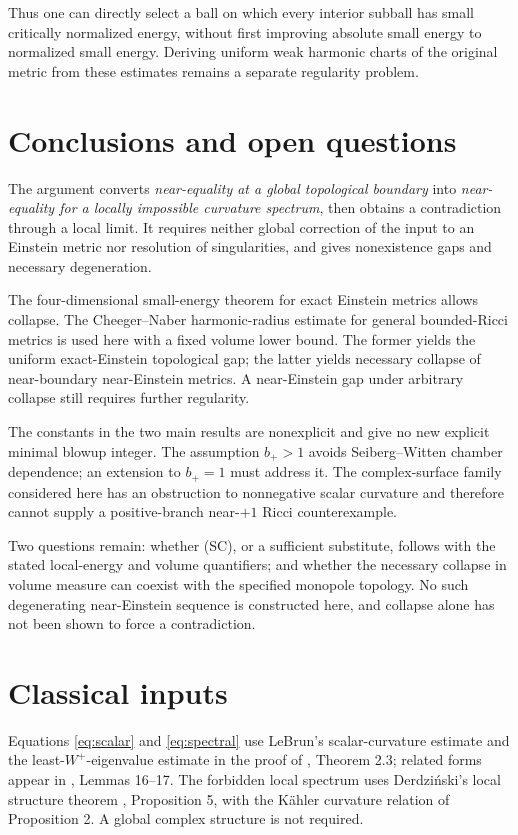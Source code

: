 \documentclass[a4paper,11pt]{article}
\theoremstyle{paper}
\numberwithin{equation}{section}
\begin{document}
Thus one can directly select a ball on which every interior subball has small critically normalized energy, without first improving absolute small energy to normalized small energy. Deriving uniform weak harmonic charts of the original metric from these estimates remains a separate regularity problem.

\section{Conclusions and open questions}

The argument converts \emph{near-equality at a global topological boundary} into \emph{near-equality for a locally impossible curvature spectrum}, then obtains a contradiction through a local limit. It requires neither global correction of the input to an Einstein metric nor resolution of singularities, and gives nonexistence gaps and necessary degeneration.

The four-dimensional small-energy theorem for exact Einstein metrics allows collapse. The Cheeger--Naber harmonic-radius estimate for general bounded-Ricci metrics is used here with a fixed volume lower bound. The former yields the uniform exact-Einstein topological gap; the latter yields necessary collapse of near-boundary near-Einstein metrics. A near-Einstein gap under arbitrary collapse still requires further regularity.

The constants in the two main results are nonexplicit and give no new explicit minimal blowup integer. The assumption $b_+>1$ avoids Seiberg--Witten chamber dependence; an extension to $b_+=1$ must address it. The complex-surface family considered here has an obstruction to nonnegative scalar curvature and therefore cannot supply a positive-branch near-$+1$ Ricci counterexample.

Two questions remain: whether (SC), or a sufficient substitute, follows with the stated local-energy and volume quantifiers; and whether the necessary collapse in volume measure can coexist with the specified monopole topology. No such degenerating near-Einstein sequence is constructed here, and collapse alone has not been shown to force a contradiction.

\appendix
\section{Classical inputs}

Equations \eqref{eq:scalar} and \eqref{eq:spectral} use LeBrun's scalar-curvature estimate and the least-$W^+$-eigenvalue estimate in the proof of \cite{lebrun2001}, Theorem 2.3; related forms appear in \cite{lebrun2004}, Lemmas 16--17. The forbidden local spectrum uses Derdzi\'nski's local structure theorem \cite{derd}, Proposition 5, with the K\"ahler curvature relation of Proposition 2. A global complex structure is not required.
\end{document}
